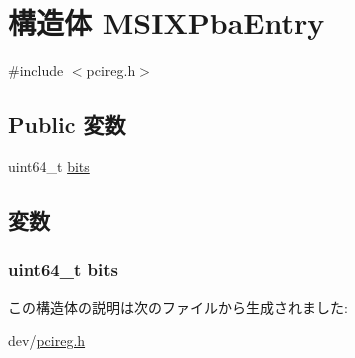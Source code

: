 \hypertarget{structMSIXPbaEntry}{
\section{構造体 MSIXPbaEntry}
\label{structMSIXPbaEntry}
}


{\ttfamily \#include $<$pcireg.h$>$}\subsection*{Public 変数}
\begin{DoxyCompactItemize}
\item 
uint64\_\-t \hyperlink{structMSIXPbaEntry_a824af546b997aeefcb71a5fe0eda3a0a}{bits}
\end{DoxyCompactItemize}


\subsection{変数}
\hypertarget{structMSIXPbaEntry_a824af546b997aeefcb71a5fe0eda3a0a}{
\subsubsection[{bits}]{\setlength{\rightskip}{0pt plus 5cm}uint64\_\-t {\bf bits}}}
\label{structMSIXPbaEntry_a824af546b997aeefcb71a5fe0eda3a0a}


この構造体の説明は次のファイルから生成されました:\begin{DoxyCompactItemize}
\item 
dev/\hyperlink{pcireg_8h}{pcireg.h}\end{DoxyCompactItemize}
